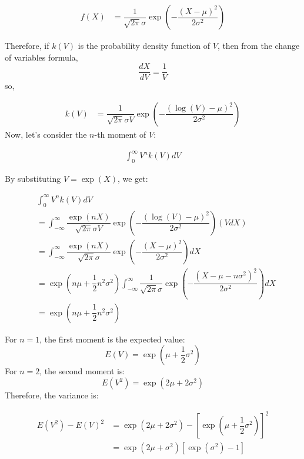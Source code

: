 \documentclass[uplatex]{jsarticle}
\begin{document}
\begin{align}
	f(X) & = \dfrac{1}{\sqrt{2 \pi} \sigma } \exp \left( - \dfrac{(X - \mu )^{2}}{2 \sigma^{2}} \right)
\end{align}

Therefore, if $k(V)$ is the probability density function of $V$, then from the change of variables formula,
$$
	\dfrac{dX}{dV} = \dfrac{1}{V}
$$
so,

\begin{align}
	k(V) & = \dfrac{1}{\sqrt{2 \pi} \sigma V} \exp \left( - \dfrac{(\log{(V)}- \mu )^{2}}{2 \sigma^{2}} \right)
\end{align}
Now, let's consider the $n$-th moment of $V$:

\begin{align}
	\int^{\infty}_{0} V^{n} k(V) dV
\end{align}

By substituting $V = \exp(X)$, we get:

\begin{align}
	 & \int^{\infty}_{0} V^{n} k(V) dV                                                                                                                                                  \\
	 & = \int^{\infty}_{-\infty} \dfrac{\exp(nX)}{\sqrt{2 \pi} \sigma V} \exp \left( - \dfrac{(\log{(V)}- \mu )^{2}}{2 \sigma^{2}} \right) (VdX)                                        \\
	 & = \int^{\infty}_{-\infty} \dfrac{\exp(nX)}{\sqrt{2 \pi} \sigma} \exp \left( - \dfrac{(X- \mu )^{2}}{2 \sigma^{2}} \right) dX                                                     \\
	 & = \exp(n \mu + \dfrac{1}{2} n^{2} \sigma^{2} ) \int^{\infty}_{-\infty} \dfrac{1}{\sqrt{2 \pi} \sigma } \exp \left( - \dfrac{(X- \mu -n \sigma^{2})^{2}}{2 \sigma^{2}} \right) dX \\
	 & = \exp(n \mu + \dfrac{1}{2} n^{2} \sigma^{2} )
\end{align}

For $n=1$, the first moment is the expected value:
$$
	E(V) = \exp(\mu + \dfrac{1}{2} \sigma^{2} )
$$
For $n=2$, the second moment is:
$$
	E(V^{2}) = \exp(2\mu + 2 \sigma^{2} )
$$
Therefore, the variance is:

\begin{align}
	E(V^{2}) - E(V)^{2} & = \exp(2\mu + 2 \sigma^{2} ) - \left[ \exp(\mu + \dfrac{1}{2} \sigma^{2} ) \right]^{2} \\
	                    & = \exp(2 \mu + \sigma^{2} ) \left[ \exp( \sigma^{2}) -1 \right]
\end{align}
\end{document}
